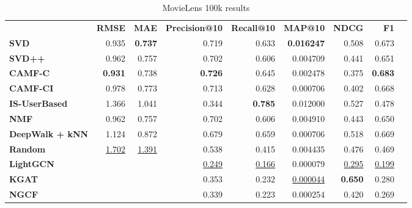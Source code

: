 \begin{table}[!htp]\centering
\caption{MovieLens 100k results}\label{tab:ml100ktable}
\scriptsize
\begin{tabular}{lrrrrrrrr}\toprule
&\textbf{RMSE} &\textbf{MAE} &\textbf{Precision@10} &\textbf{Recall@10} &\textbf{MAP@10} &\textbf{NDCG} &\textbf{F1} \\\cmidrule{2-8}
\textbf{SVD} &0.935 &\textbf{0.737} &0.719 &0.633 &\textbf{0.016247} &0.508 &0.673 \\\cmidrule{1-8}
\textbf{SVD++} &0.962 &0.757 &0.702 &0.606 &0.004709 &0.441 &0.651 \\\cmidrule{1-8}
\textbf{CAMF-C} &\textbf{0.931} &0.738 &\textbf{0.726} &0.645 &0.002478 &0.375 &\textbf{0.683} \\\cmidrule{1-8}
\textbf{CAMF-CI} &0.978 &0.773 &0.713 &0.628 &0.000706 &0.402 &0.668 \\\cmidrule{1-8}
\textbf{IS-UserBased} &1.366 &1.041 &0.344 &\textbf{0.785} &0.012000 &0.527 &0.478 \\\cmidrule{1-8}
\textbf{NMF} &0.962 &0.757 &0.702 &0.606 &0.004910 &0.443 &0.650 \\\cmidrule{1-8}
\textbf{DeepWalk + kNN} &1.124 &0.872 &0.679 &0.659 &0.000706 &0.518 &0.669 \\\cmidrule{1-8}
\textbf{Random} &\ul{1.702} &\ul{1.391} &0.538 &0.415 &0.004435 &0.476 &0.469 \\\cmidrule{1-8}
\textbf{LightGCN} & & &\ul{0.249} &\ul{0.166} &0.000079 &\ul{0.295} &\ul{0.199} \\\cmidrule{1-1}\cmidrule{1-8}
\textbf{KGAT} & & &0.353 &0.232 &\ul{0.000044} &\textbf{0.650} &0.280 \\\midrule
\textbf{NGCF} & & &0.339 &0.223 &0.000254 &0.420 &0.269 \\
\bottomrule
\end{tabular}
\end{table}

